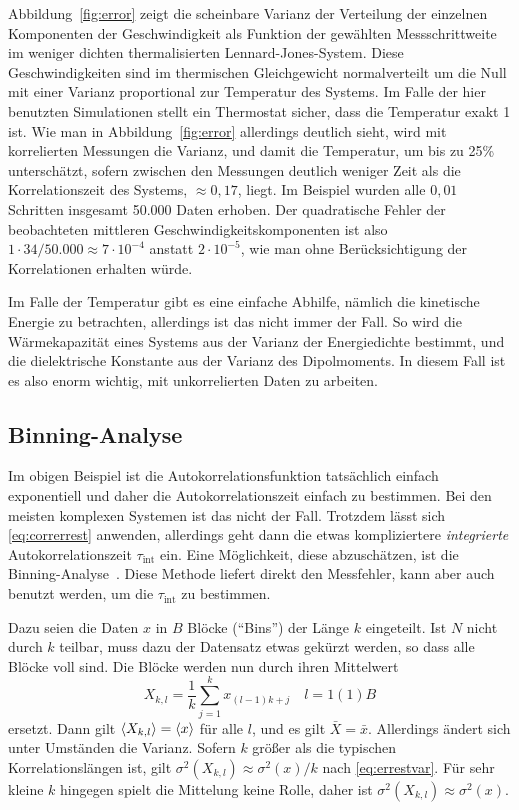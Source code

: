 Abbildung~\ref{fig:error} zeigt die scheinbare Varianz der Verteilung
der einzelnen Komponenten der Geschwindigkeit als Funktion der
gewählten Messschrittweite im weniger dichten thermalisierten
Lennard-Jones-System. Diese Geschwindigkeiten sind im thermischen
Gleichgewicht normalverteilt um die Null mit einer Varianz
proportional zur Temperatur des Systems. Im Falle der hier benutzten
Simulationen stellt ein Thermostat sicher, dass die Temperatur exakt 1
ist. Wie man in Abbildung~\ref{fig:error} allerdings deutlich sieht,
wird mit korrelierten Messungen die Varianz, und damit die Temperatur,
um bis zu 25\% unterschätzt, sofern zwischen den Messungen deutlich
weniger Zeit als die Korrelationszeit des Systems, $\approx 0,17$,
liegt. Im Beispiel wurden alle $0,01$ Schritten insgesamt 50.000 Daten
erhoben. Der quadratische Fehler der beobachteten mittleren
Geschwindigkeitskomponenten ist also $1\cdot 34/50.000 \approx 7\cdot
10^{-4}$ anstatt $2\cdot 10^{-5}$, wie man ohne Berücksichtigung der
Korrelationen erhalten würde.

Im Falle der Temperatur gibt es eine einfache Abhilfe, nämlich die
kinetische Energie zu betrachten, allerdings ist das nicht immer der
Fall. So wird die Wärmekapazität eines Systems aus der Varianz der
Energiedichte bestimmt, und die dielektrische Konstante aus der
Varianz des Dipolmoments. In diesem Fall ist es also enorm wichtig,
mit unkorrelierten Daten zu arbeiten.

\subsection{Binning-Analyse}

Im obigen Beispiel ist die Autokorrelationsfunktion tatsächlich
einfach exponentiell und daher die Autokorrelationszeit einfach zu
bestimmen. Bei den meisten komplexen Systemen ist das nicht der Fall.
Trotzdem lässt sich \eqref{eq:correrrest} anwenden, allerdings geht
dann die etwas kompliziertere \emph{integrierte} Autokorrelationszeit
$\tau_\text{int}$ ein. Eine Möglichkeit, diese abzuschätzen, ist die
Binning-Analyse~\cite{janke02a}. Diese Methode liefert direkt den
Messfehler, kann aber auch benutzt werden, um die $\tau_\text{int}$ zu
bestimmen.

Dazu seien die Daten $x$ in $B$ Blöcke (\enquote{Bins}) der Länge $k$
eingeteilt. Ist $N$ nicht durch $k$ teilbar, muss dazu der Datensatz
etwas gekürzt werden, so dass alle Blöcke voll sind. Die Blöcke werden
nun durch ihren Mittelwert
\begin{equation}
  X_{k,l} = \frac{1}{k}\sum_{j=1}^{k}x_{(l-1)k + j}\quad l=1(1)B
\end{equation}
ersetzt. Dann gilt $\left\langle{X_{k,l}}\right\rangle = \left\langle{x}\right\rangle$ für alle $l$, und es
gilt $\bar{X} = \bar{x}$. Allerdings ändert sich unter Umständen die
Varianz. Sofern $k$ größer als die typischen Korrelationslängen ist,
gilt $\sigma^2(X_{k,l}) \approx \sigma^2(x)/k$ nach
\eqref{eq:errestvar}. Für sehr kleine $k$ hingegen spielt die
Mittelung keine Rolle, daher ist $\sigma^2(X_{k,l}) \approx
\sigma^2(x)$.

